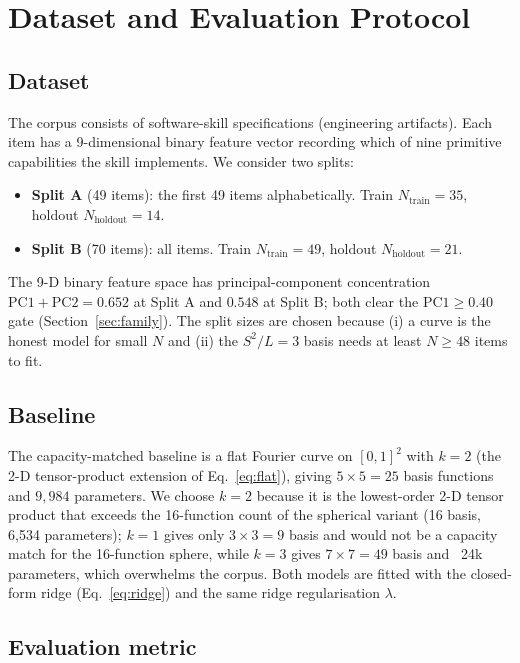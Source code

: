 \documentclass[11pt,a4paper]{article}
\begin{document}
\section{Dataset and Evaluation Protocol}

\subsection{Dataset}

The corpus consists of software-skill specifications (engineering artifacts). Each item has a 9-dimensional binary feature vector recording which of nine primitive capabilities the skill implements. We consider two splits:
\begin{itemize}
\item \textbf{Split A} (49 items): the first 49 items alphabetically. Train $N_{\mathrm{train}}=35$, holdout $N_{\mathrm{holdout}}=14$.
\item \textbf{Split B} (70 items): all items. Train $N_{\mathrm{train}}=49$, holdout $N_{\mathrm{holdout}}=21$.
\end{itemize}

The 9-D binary feature space has principal-component concentration $\mathrm{PC1}+\mathrm{PC2} = 0.652$ at Split A and $0.548$ at Split B; both clear the $\mathrm{PC1} \geq 0.40$ gate (Section~\ref{sec:family}). The split sizes are chosen because (i) a curve is the honest model for small $N$ and (ii) the $S^2/L=3$ basis needs at least $N \geq 48$ items to fit.

\subsection{Baseline}

The capacity-matched baseline is a flat Fourier curve on $[0,1]^2$ with $k=2$ (the 2-D tensor-product extension of Eq.~\ref{eq:flat}), giving $5 \times 5 = 25$ basis functions and $9{,}984$ parameters. We choose $k=2$ because it is the lowest-order 2-D tensor product that exceeds the 16-function count of the spherical variant (16 basis, 6,534 parameters); $k=1$ gives only $3 \times 3 = 9$ basis and would not be a capacity match for the 16-function sphere, while $k=3$ gives $7 \times 7 = 49$ basis and ~24k parameters, which overwhelms the corpus. Both models are fitted with the closed-form ridge (Eq.~\ref{eq:ridge}) and the same ridge regularisation $\lambda$.

\subsection{Evaluation metric}
\end{document}
